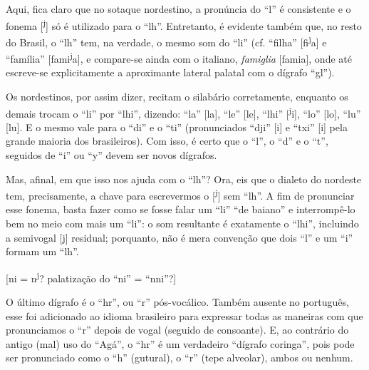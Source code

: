 \documentclass[12pt, a5paper, titlepage]{article}
\begin{document}
Aqui, fica claro que no sotaque nordestino, a pronúncia do ``l'' é consistente e o fonema [\textsuperscript{j}] só é utilizado para o ``lh''. Entretanto, é evidente também que, no resto do Brasil, o ``lh'' tem, na verdade, o mesmo som do ``li'' (cf. ``filha'' [f\textprimstress i\textsuperscript{j}a] e ``família'' [fa\textprimstress mi\textsuperscript{j}a], e compare-se ainda com o italiano, \textit{famiglia} [fa\textprimstress mi\textturny a], onde até escreve-se explicitamente a aproximante lateral palatal com o dígrafo ``gl'').

Os nordestinos, por assim dizer, recitam o silabário corretamente, enquanto os demais trocam o ``li'' por ``lhi'', dizendo: ``la'' [la], ``le'' [le], ``lhi'' [\textsuperscript{j}i], ``lo'' [lo], ``lu'' [lu]. E o mesmo vale para o ``di'' e o ``ti'' (pronunciados ``dji'' [i] e ``txi'' [i] pela grande maioria dos brasileiros). Com isso, é certo que o ``l'', o ``d'' e o ``t'', seguidos de ``i'' ou ``y'' devem ser novos dígrafos.

Mas, afinal, em que isso nos ajuda com o ``lh''? Ora, eis que o dialeto do nordeste tem, precisamente, a chave para escrevermos o [\textsuperscript{j}] sem ``lh''. A fim de pronunciar esse fonema, basta fazer como se fosse falar um ``li'' ``de baiano'' e interrompê-lo bem no meio com mais um ``li'': o som resultante é exatamente o ``lhi'', incluindo a semivogal [j] residual; porquanto, não é mera convenção que dois ``l'' e um ``i'' formam um ``lh''.

[ni = n\textsuperscript{j}? palatização do ``ni'' = ``nni''?]

O último dígrafo é o ``hr'', ou ``r'' pós-vocálico. Também ausente no português, esse foi adicionado ao idioma brasileiro para expressar todas as maneiras com que pronunciamos o ``r'' depois de vogal (seguido de consoante). E, ao contrário do antigo (mal) uso do ``Agá'', o ``hr'' é um verdadeiro ``dígrafo coringa'', pois pode ser pronunciado como o ``h'' (gutural), o ``r'' (tepe alveolar), ambos ou nenhum.
\end{document}
